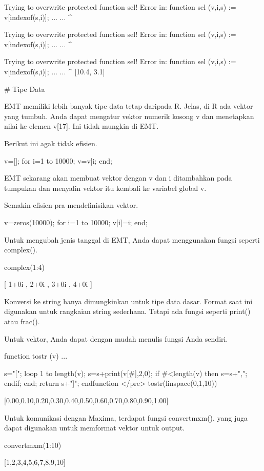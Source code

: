 \documentclass{article}
\begin{document}
    Trying to overwrite protected function sel!
    Error in:
    function sel (v,i,s) := v[indexof(s,i)]; ... ...
                 ^
    
    Trying to overwrite protected function sel!
    Error in:
    function sel (v,i,s) := v[indexof(s,i)]; ... ...
                 ^
    
    Trying to overwrite protected function sel!
    Error in:
    function sel (v,i,s) := v[indexof(s,i)]; ... ...
                 ^
    [10.4,  3.1]

# Tipe Data

EMT memiliki lebih banyak tipe data tetap daripada R. Jelas, di R ada
vektor yang tumbuh. Anda dapat mengatur vektor numerik kosong v dan
menetapkan nilai ke elemen v[17]. Ini tidak mungkin di EMT.


Berikut ini agak tidak efisien.


\>v=[]; for i=1 to 10000; v=v|i; end;


EMT sekarang akan membuat vektor dengan v dan i ditambahkan pada
tumpukan dan menyalin vektor itu kembali ke variabel global v.


Semakin efisien pra-mendefinisikan vektor.


\>v=zeros(10000); for i=1 to 10000; v[i]=i; end;


Untuk mengubah jenis tanggal di EMT, Anda dapat menggunakan fungsi
seperti complex().


\>complex(1:4)


    [ 1+0i ,  2+0i ,  3+0i ,  4+0i  ]

Konversi ke string hanya dimungkinkan untuk tipe data dasar. Format
saat ini digunakan untuk rangkaian string sederhana. Tetapi ada fungsi
seperti print() atau frac().


Untuk vektor, Anda dapat dengan mudah menulis fungsi Anda sendiri.


\>function tostr (v) ...


    s="[";
    loop 1 to length(v);
       s=s+print(v[#],2,0);
       if #<length(v) then s=s+","; endif;
    end;
    return s+"]";
    endfunction
</pre>
\>tostr(linspace(0,1,10))


    [0.00,0.10,0.20,0.30,0.40,0.50,0.60,0.70,0.80,0.90,1.00]

Untuk komunikasi dengan Maxima, terdapat fungsi convertmxm(), yang
juga dapat digunakan untuk memformat vektor untuk output.


\>convertmxm(1:10)


    [1,2,3,4,5,6,7,8,9,10]
\end{document}
